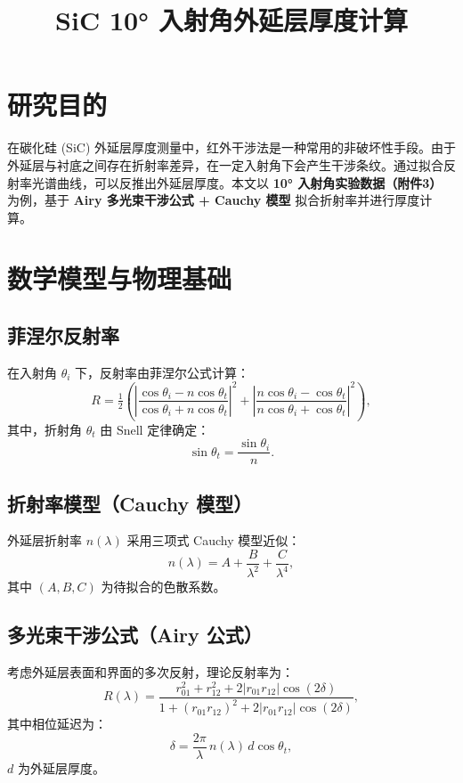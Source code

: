 \documentclass[12pt,a4paper]{article}
\title{SiC 10° 入射角外延层厚度计算}
\author{}
\date{}
\begin{document}
\maketitle

\section{研究目的}
在碳化硅 (SiC) 外延层厚度测量中，红外干涉法是一种常用的非破坏性手段。由于外延层与衬底之间存在折射率差异，在一定入射角下会产生干涉条纹。通过拟合反射率光谱曲线，可以反推出外延层厚度。本文以 \textbf{10° 入射角实验数据（附件3）} 为例，基于 \textbf{Airy 多光束干涉公式 + Cauchy 模型} 拟合折射率并进行厚度计算。

\section{数学模型与物理基础}

\subsection{菲涅尔反射率}
在入射角 $\theta_i$ 下，反射率由菲涅尔公式计算：
\begin{equation}
R = \tfrac{1}{2} \left( 
\left|\frac{\cos\theta_i - n\cos\theta_t}{\cos\theta_i + n\cos\theta_t}\right|^2 +
\left|\frac{n\cos\theta_i - \cos\theta_t}{n\cos\theta_i + \cos\theta_t}\right|^2
\right),
\end{equation}
其中，折射角 $\theta_t$ 由 Snell 定律确定：
\begin{equation}
\sin\theta_t = \frac{\sin\theta_i}{n}.
\end{equation}

\subsection{折射率模型（Cauchy 模型）}
外延层折射率 $n(\lambda)$ 采用三项式 Cauchy 模型近似：
\begin{equation}
n(\lambda) = A + \frac{B}{\lambda^2} + \frac{C}{\lambda^4},
\end{equation}
其中 $(A,B,C)$ 为待拟合的色散系数。

\subsection{多光束干涉公式（Airy 公式）}
考虑外延层表面和界面的多次反射，理论反射率为：
\begin{equation}
R(\lambda) = 
\frac{r_{01}^2 + r_{12}^2 + 2|r_{01}r_{12}|\cos(2\delta)}
     {1 + (r_{01}r_{12})^2 + 2|r_{01}r_{12}|\cos(2\delta)},
\end{equation}
其中相位延迟为：
\begin{equation}
\delta = \frac{2\pi}{\lambda}\,n(\lambda)\,d\cos\theta_t,
\end{equation}
$d$ 为外延层厚度。
\end{document}
